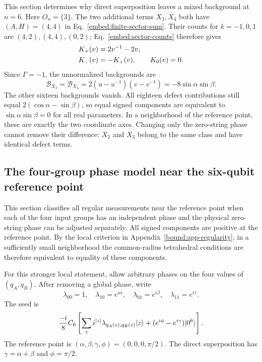 This section determines why direct superposition leaves a mixed background at $n=6$. Here $O_n=\{3\}$. The two additional terms $X_3,X_4$ both have $(A,H)=(4,4)$ in Eq.~\eqref{embed:finite-sector-sum}. Their counts for $k=-1,0,1$ are $(4,2),(4,4),(0,2)$; Eq.~\eqref{embed:sector-counts} therefore gives
\begin{align}
 K_+(v)&=2v^{-1}-2v,\notag\\
 K_-(v)&=-K_+(v),\qquad K_0(v)=0.
 \label{embed:six-sectors}
\end{align}
Since $\Gamma=-1$, the unnormalized backgrounds are
\begin{equation}
 \mathcal B_{X_3}=\mathcal B_{X_4}
 =2(u-u^{-1})(v-v^{-1})=-8\sin\alpha\sin\beta.
 \label{embed:six-mixed}
\end{equation}
The other sixteen backgrounds vanish. All eighteen defect contributions still equal $2(\cos\alpha-\sin\beta)$, so equal signed components are equivalent to $\sin\alpha\sin\beta=0$ for all real parameters. In a neighborhood of the reference point, these are exactly the two coordinate axes. Changing only the zero-string phase cannot remove their difference: $X_2$ and $X_3$ belong to the same class and have identical defect terms.

\subsection{The four-group phase model near the six-qubit reference point}
\label{embed:app-six-local}

This section classifies all regular measurements near the reference point when each of the four input groups has an independent phase and the physical zero-string phase can be adjusted separately. All signed components are positive at the reference point. By the local criterion in Appendix~\ref{bound:app-regularity}, in a sufficiently small neighborhood the common-radius tetrahedral conditions are therefore equivalent to equality of these components.

For this stronger local statement, allow arbitrary phases on the four values of $(q_A,q_B)$. After removing a global phase, write
\begin{equation}
 \lambda_{00}=1,\quad\lambda_{10}=e^{i\alpha},\quad
 \lambda_{01}=e^{i\beta},\quad\lambda_{11}=e^{i\gamma}.
 \label{embed:colors}
\end{equation}
The seed is
\begin{equation}
 \frac{-i}{8}C_6\left[\sum_z i^{|z|}\lambda_{q_A(z),q_B(z)}\lvert z\rangle
 +(e^{i\phi}-e^{i\gamma})\lvert 0^6\rangle\right].
 \label{embed:color-seed}
\end{equation}
The reference point is $(\alpha,\beta,\gamma,\phi)=(0,0,0,\pi/2)$. The direct superposition has $\gamma=\alpha+\beta$ and $\phi=\pi/2$.

